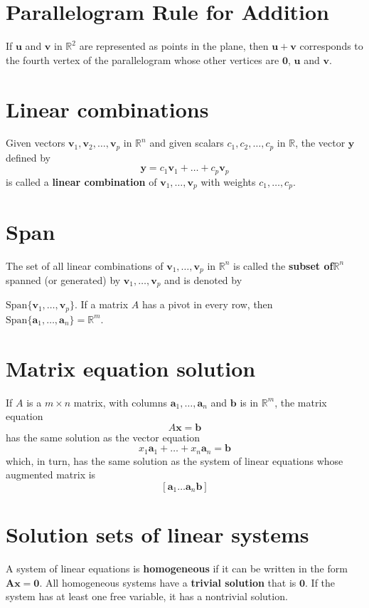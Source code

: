 \documentclass[oneside]{book}
\begin{document}
\section{Parallelogram Rule for Addition}
If \(\mathbf{u}\) and \(\mathbf{v}\) in \(\mathbb{R}^2\)
are represented as points in the plane,
then \(\mathbf{u} + \mathbf{v}\) corresponds to the fourth vertex of the
parallelogram whose other vertices are \(\mathbf{0}\), \(\mathbf{u}\) and
\(\mathbf{v}\).

\section{Linear combinations}
Given vectors \(\mathbf{v}_1, \mathbf{v}_2, \ldots, \mathbf{v}_p\) in
\(\mathbb{R}^n\) and given scalars \(c_1, c_2, \ldots, c_p\) in \(\mathbb{R}\),
the vector \(\mathbf{y}\) defined by
\[ \mathbf{y} = c_1 \mathbf{v}_1 + \ldots + c_p \mathbf{v}_p \]
is called a \textbf{linear combination} of
\(\mathbf{v}_1, \ldots, \mathbf{v}_p\) with weights \(c_1, \ldots, c_p\).

\section{Span}
The set of all linear combinations of \(\mathbf{v}_1, \ldots, \mathbf{v}_p\) in
\(\mathbb{R}^n\) is called the \textbf{subset of}\(\mathbb{R}^n\) spanned (or
generated) by \(\mathbf{v}_1, \ldots, \mathbf{v}_p\) and is denoted by

\(\mathrm{Span}\{\mathbf{v}_1, \ldots, \mathbf{v}_p\}\). If a matrix \(A\) has a
pivot in every row, then \(\mathrm{Span} \{\mathbf{a}_1, \ldots, \mathbf{a}_n\}
= \mathbb{R}^m\).

\section{Matrix equation solution}
If \(A\) is a \(m \times n\) matrix, with columns \(\mathbf{a}_1, \ldots,
\mathbf{a}_n\) and \(\mathbf{b}\) is in \(\mathbb{R}^m\),
the matrix equation
\[ A\mathbf{x} = \mathbf{b} \]
has the same solution as the vector equation
\[ x_1\mathbf{a}_1 + \ldots + x_n\mathbf{a}_n = \mathbf{b} \]
which, in turn,
has the same solution as the system of linear equations whose
augmented matrix is
\[ [ \mathbf{a}_1 \ldots \mathbf{a}_n \mathbf{b} ] \]

\section{Solution sets of linear systems}
A system of linear equations is \textbf{homogeneous}
if it can be written in the form \( \mathbf{A x} = \mathbf{0} \).
All homogeneous systems have a \textbf{trivial solution} that is \(\mathbf{0}\).
If the system has at least one free variable, it has a nontrivial solution.
\end{document}
